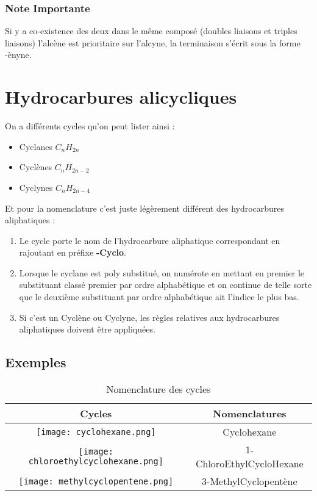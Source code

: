 \documentclass[a4paper, oneside]{book}
\begin{document}
\subsubsection{Note Importante}
Si y a co-existence des deux dans le même composé (doubles liaisons et triples liaisons) l'alcène est prioritaire sur l'alcyne, la terminaison s'écrit sous la forme -ènyne. 
\section{Hydrocarbures alicycliques}
On a différents cycles qu'on peut lister ainsi :
\begin{itemize}
    \item Cyclanes $C_nH_{2n}$
    \item Cyclènes $C_nH_{2n-2}$
    \item Cyclynes $C_nH_{2n-4}$
\end{itemize}
Et pour la nomenclature c'est juste légèrement différent des hydrocarbures aliphatiques :
\begin{enumerate}
    \item Le cycle porte le nom de l'hydrocarbure aliphatique correspondant en rajoutant en préfixe \textbf{-Cyclo}.
    \item Lorsque le cyclane est poly substitué, on numérote en mettant en premier le substituant classé premier par ordre alphabétique et on continue de telle sorte que le deuxième substituant par ordre alphabétique ait l'indice le plus bas.
    \item Si c'est un Cyclène ou Cyclyne, les règles relatives aux hydrocarbures aliphatiques doivent être appliquées.
\end{enumerate}
\subsection{Exemples}
\begin{table}[ht]
    \centering
    \begin{tabular}{|c|c|}
        \hline
        \textbf{Cycles} & \textbf{Nomenclatures} \\
        \hline
        \texttt{[image: cyclohexane.png]} & Cyclohexane \\
         \hline
         \texttt{[image: chloroethylcyclohexane.png]} & 1-ChloroEthylCycloHexane\\
         \hline
         \texttt{[image: methylcyclopentene.png]} & 3-MethylCyclopentène \\
         \hline
    \end{tabular}
        \caption{Nomenclature des cycles}
    \label{tab:my_label}
\end{table}
\end{document}
